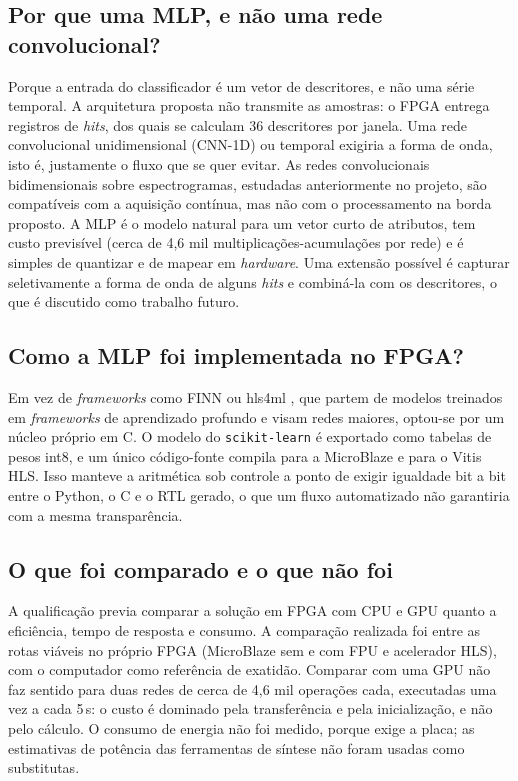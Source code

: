 \subsection{Por que uma MLP, e não uma rede convolucional?}

Porque a entrada do classificador é um vetor de descritores, e não uma série temporal. A arquitetura proposta não transmite as amostras: o FPGA entrega registros de \textit{hits}, dos quais se calculam 36 descritores por janela. Uma rede convolucional unidimensional (CNN-1D) ou temporal exigiria a forma de onda, isto é, justamente o fluxo que se quer evitar. As redes convolucionais bidimensionais sobre espectrogramas, estudadas anteriormente no projeto, são compatíveis com a aquisição contínua, mas não com o processamento na borda proposto. A MLP é o modelo natural para um vetor curto de atributos, tem custo previsível (cerca de 4,6 mil multiplicações-acumulações por rede) e é simples de quantizar e de mapear em \textit{hardware}. Uma extensão possível é capturar seletivamente a forma de onda de alguns \textit{hits} e combiná-la com os descritores, o que é discutido como trabalho futuro.

\subsection{Como a MLP foi implementada no FPGA?}

Em vez de \textit{frameworks} como FINN ou hls4ml \cite{Umuroglu2017FINN,duarte2018}, que partem de modelos treinados em \textit{frameworks} de aprendizado profundo e visam redes maiores, optou-se por um núcleo próprio em C. O modelo do \texttt{scikit-learn} é exportado como tabelas de pesos int8, e um único código-fonte compila para a MicroBlaze e para o Vitis HLS. Isso manteve a aritmética sob controle a ponto de exigir igualdade bit a bit entre o Python, o C e o RTL gerado, o que um fluxo automatizado não garantiria com a mesma transparência.

\subsection{O que foi comparado e o que não foi}

A qualificação previa comparar a solução em FPGA com CPU e GPU quanto a eficiência, tempo de resposta e consumo. A comparação realizada foi entre as rotas viáveis no próprio FPGA (MicroBlaze sem e com FPU e acelerador HLS), com o computador como referência de exatidão. Comparar com uma GPU não faz sentido para duas redes de cerca de 4,6 mil operações cada, executadas uma vez a cada 5\,s: o custo é dominado pela transferência e pela inicialização, e não pelo cálculo. O consumo de energia não foi medido, porque exige a placa; as estimativas de potência das ferramentas de síntese não foram usadas como substitutas.

